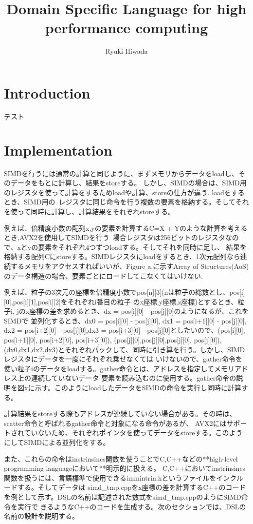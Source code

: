 \documentclass[ams, a4j]{U-AizuGT}
\author{Ryuki Hiwada}
\title{Domain Specific Language for high performance computing}
\begin{document}
\maketitle
\begin{abstract}

\end{abstract}
\section{Introduction}
テスト


\section{Implementation}

SIMDを行うには通常の計算と同じように、まずメモリからデータをloadし、そのデータをもとに計算し、結果をstoreする。
しかし、SIMDの場合は、SIMD用のレジスタを使って計算をするためloadや計算、storeの仕方が違う. loadをするとき、SIMD用の\
レジスタに同じ命令を行う複数の要素を格納する。そしてそれを使って同時に計算し、計算結果をそれぞれstoreする。\

 例えば、倍精度小数の配列x,yの要素を計算するC=X + Yのような計算を考えるとき,AVX2を使用してSIMDを行う\
場合レジスタは256ビットのレジスタなので、xとyの要素をそれぞれ4つずつloadする。そしてそれを同時に足し、
結果を格納する配列Cにstoreする。SIMDレジスタにloadをするとき、1次元配列なら連続するメモリをアクセスすればいいが、Figure 
a.に示すArray of Structures(AoS)のデータ構造の場合、要素ごとにロードしてこなくてはいけない.

例えば、粒子の3次元の座標を倍精度小数でpos[n][3](nは粒子の総数とし、pos[i][0],pos[i][1],pos[i][2]をそれぞれi番目の粒子
のx座標,y座標,z座標)とするとき、粒子i, jのx座標の差を求めるとき、dx = pos[i][0] - pos[j][0]のようになるが、これをSIMDで
並列化するとき、dx0 = pos[i][0] - pos[j][0], dx1 = pos[i+1][0] - pos[j][0], dx2 = pos[i+2][0] - pos[j][0],dx3 = 
pos[i+3][0] - pos[j][0]としたいので、(pos[i][0], pos[i+1][0], pos[i+2][0], pos[i+3][0]), (pos[j][0],pos[j][0],pos[j][0],
pos[j][0]),(dx0,dx1,dx2,dx3)とそれぞれパックして、同時に引き算を行う。しかし、SIMDレジスタにデータを一度にそれぞれ乗せなくては
いけないので、gather命令を使い粒子iのデータをloadする。gather命令とは、アドレスを指定してメモリアドレス上の連続していないデータ
要素を読み込むのに使用する。gather命令の説明を図xに示す。このようにloadしたデータをSIMDの命令を実行し同時に計算する。

計算結果をstoreする際もアドレスが連続していない場合がある。その時は、scatter命令と呼ばれるgather命令と対象になる命令があるが、
AVX2にはサポートされていないため、それぞれポインタを使ってデータをstoreする。このようにしてSIMDによる並列化をする。

また、これらの命令はinstrinsincs関数を使うことでC,C++などの**high-level programming languageにおいて**明示的に扱える。
C,C++においてinstrinsincs関数を扱うには、言語標準で使用できるimmintrin.hというファイルをインクルードする。そしてデータは
simd_tmp.cppをx座標の差を計算するC++のコードを例として示す。{DSLの名前}は記述された数式をsimd_tmp.cppのようにSIMD命令を実行で
きるようなC++のコードを生成する。次のセクションでは、{DSLの名前}の設計を説明する。
\end{document}
